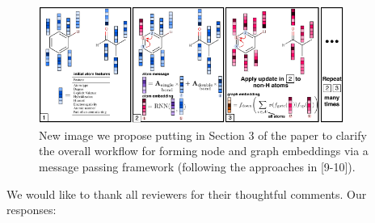 \documentclass{article}
\begin{document}


\begin{figure}
\centering
\vspace{-1pt}
  \includegraphics[width=10cm]{graph_nn.pdf}
  \vspace{-18pt}
 \caption{New image we propose putting in Section 3 of the paper to clarify the overall workflow for forming node and graph embeddings via a message passing framework (following the approaches in [9-10]).}
 \label{fig:new-diagram}
 \vspace{-5ex}
\end{figure}

We would like to thank all reviewers for their thoughtful comments. 
Our responses:
\end{document}
